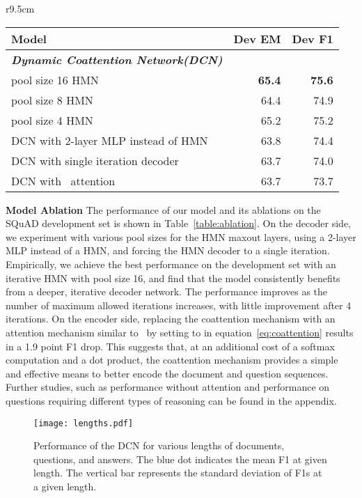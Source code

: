 \documentclass{article} \usepackage{iclr2017_conference,times}
\newcommand{\squad}{SQuAD\xspace}
\newcommand{\ours}{DCN\xspace}
\newcommand{\oursfull}{Dynamic Coattention Network\xspace}
\begin{document}
\begin{wraptable}{r}{9.5cm}
\vspace{-0.75cm}
\centering
\begin{tabular}{lrr}
  \toprule
  Model & Dev EM & Dev F1\\
  \midrule
  \textbf{\textit{\oursfull (\ours)}}\\
  pool size 16 HMN & \textbf{65.4}  & \textbf{75.6}\\
  pool size 8 HMN & 64.4  & 74.9\\
  pool size 4 HMN & 65.2  & 75.2\\
  \midrule
  \ours with 2-layer MLP instead of HMN & 63.8  & 74.4\\
  \ours with single iteration decoder & 63.7  & 74.0\\
  \ours with~\citet{wang2016machine} attention & 63.7  & 73.7\\
  \bottomrule
\end{tabular}
\vspace{-0.3cm}
\caption{
Single model ablations on the development set.
}
\vspace{-0.3cm}
\label{table:ablation}
\end{wraptable}

\textbf{Model Ablation}
The performance of our model and its ablations on the \squad development set is shown in Table~\ref{table:ablation}.
On the decoder side, we experiment with various pool sizes for the HMN maxout layers, using a 2-layer MLP instead of a HMN, and forcing the HMN decoder to a single iteration.
Empirically, we achieve the best performance on the development set with an iterative HMN with pool size 16, and find that the model consistently benefits from a deeper, iterative decoder network.
The performance improves as the number of maximum allowed iterations increases, with little improvement after 4 iterations.
On the encoder side, replacing the coattention mechanism with an attention mechanism similar to~\cite{wang2016machine} by setting  to  in equation~\ref{eq:coattention} results in a 1.9 point F1 drop.
This suggests that, at an additional cost of a softmax computation and a dot product, the coattention mechanism provides a simple and effective means to better encode the document and question sequences.
Further studies, such as performance without attention and performance on questions requiring different types of reasoning can be found in the appendix.

\begin{figure}[t]
\centering
\texttt{[image: lengths.pdf]}
\vspace{-0.7cm}
\caption{Performance of the \ours for various lengths of documents, questions, and answers. The blue dot indicates the mean F1 at given length. The vertical bar represents the standard deviation of F1s at a given length.}
\label{fig:perf-lengths}
\vspace{-0.7cm}
\end{figure}
\end{document}
